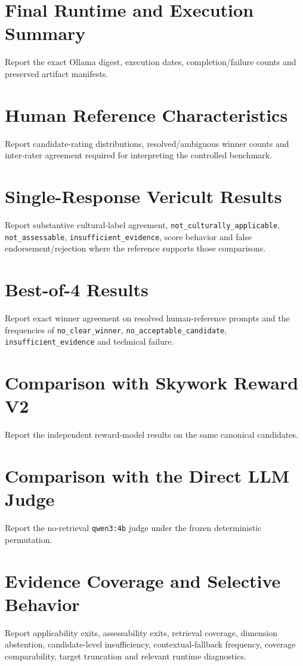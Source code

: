\section{Final Runtime and Execution Summary}
Report the exact Ollama digest, execution dates, completion/failure counts and preserved artifact manifests.

\section{Human Reference Characteristics}
Report candidate-rating distributions, resolved/ambiguous winner counts and inter-rater agreement required for interpreting the controlled benchmark.

\section{Single-Response Vericult Results}
Report substantive cultural-label agreement, \texttt{not\_culturally\_applicable}, \texttt{not\_assessable}, \texttt{insufficient\_evidence}, score behavior and false endorsement/rejection where the reference supports those comparisons.

\section{Best-of-4 Results}
Report exact winner agreement on resolved human-reference prompts and the frequencies of \texttt{no\_clear\_winner}, \texttt{no\_acceptable\_candidate}, \texttt{insufficient\_evidence} and technical failure.

\section{Comparison with Skywork Reward V2}
Report the independent reward-model results on the same canonical candidates.

\section{Comparison with the Direct LLM Judge}
Report the no-retrieval \texttt{qwen3:4b} judge under the frozen deterministic permutation.

\section{Evidence Coverage and Selective Behavior}
Report applicability exits, assessability exits, retrieval coverage, dimension abstention, candidate-level insufficiency, contextual-fallback frequency, coverage comparability, target truncation and relevant runtime diagnostics.

